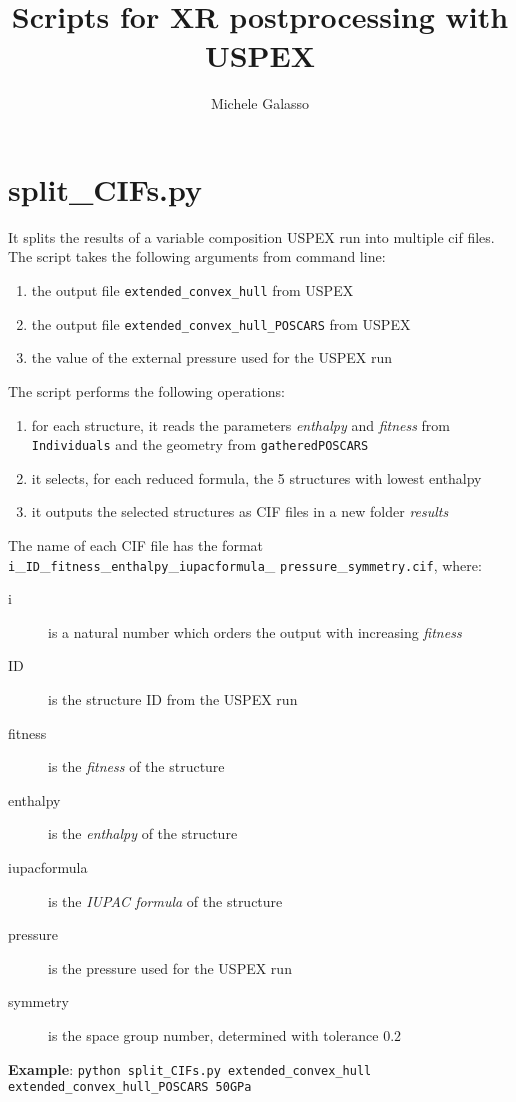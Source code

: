 \documentclass{article}
\begin{document}
\title{Scripts for XR postprocessing with USPEX}
\author{Michele Galasso}

\maketitle


\section{split\_CIFs.py}
It splits the results of a variable composition USPEX run into multiple cif files. The script takes the following arguments from command line:
\begin{enumerate}
	\item the output file \texttt{extended\_convex\_hull} from USPEX
	\item the output file \texttt{extended\_convex\_hull\_POSCARS} from USPEX
	\item the value of the external pressure used for the USPEX run
\end{enumerate}
The script performs the following operations:
\begin{enumerate}
	\item for each structure, it reads the parameters \emph{enthalpy} and \emph{fitness} from \texttt{Individuals} and the geometry from \texttt{gatheredPOSCARS}
	\item it selects, for each reduced formula, the 5 structures with lowest enthalpy
	\item it outputs the selected structures as CIF files in a new folder \textit{results}
\end{enumerate}
The name of each CIF file has the format \texttt{i}\_\texttt{ID}\_\texttt{fitness}\_\texttt{enthalpy}\_\texttt{iupacformula}\_ \texttt{pressure}\_\texttt{symmetry.cif}, where:
\begin{description}
	\item[i] is a natural number which orders the output with increasing \emph{fitness}
	\item[ID] is the structure ID from the USPEX run
	\item[fitness] is the \emph{fitness} of the structure
	\item[enthalpy] is the \emph{enthalpy} of the structure
	\item[iupacformula] is the \emph{IUPAC formula} of the structure
	\item[pressure] is the pressure used for the USPEX run
	\item[symmetry] is the space group number, determined with tolerance $0.2$\end{description}
\textbf{Example}: \texttt{python split\_CIFs.py extended\_convex\_hull \\ extended\_convex\_hull\_POSCARS 50GPa}
\end{document}
